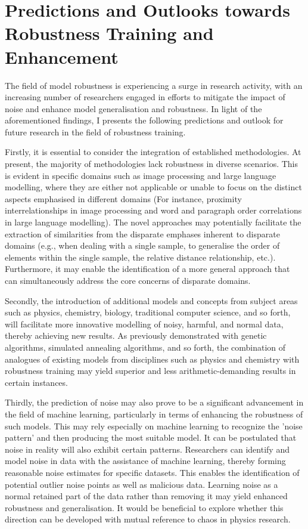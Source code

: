\documentclass{article}
\begin{document}
\section{Predictions and Outlooks towards Robustness Training and Enhancement}

The field of model robustness is experiencing a surge in research activity, with an increasing number of researchers engaged in efforts to mitigate the impact of noise and enhance model generalisation and robustness. In light of the aforementioned findings, I presents the following predictions and outlook for future research in the field of robustness training.

Firstly, it is essential to consider the integration of established methodologies. At present, the majority of methodologies lack robustness in diverse scenarios. This is evident in specific domains such as image processing and large language modelling, where they are either not applicable or unable to focus on the distinct aspects emphasised in different domains (For instance, proximity interrelationships in image processing and word and paragraph order correlations in large language modelling). The novel approaches may potentially facilitate the extraction of similarities from the disparate emphases inherent to disparate domains (e.g., when dealing with a single sample, to generalise the order of elements within the single sample, the relative distance relationship, etc.). Furthermore, it may enable the identification of a more general approach that can simultaneously address the core concerns of disparate domains.

Secondly, the introduction of additional models and concepts from subject areas such as physics, chemistry, biology, traditional computer science, and so forth, will facilitate more innovative modelling of noisy, harmful, and normal data, thereby achieving new results. As previously demonstrated with genetic algorithms, simulated annealing algorithms, and so forth, the combination of analogues of existing models from disciplines such as physics and chemistry with robustness training may yield superior and less arithmetic-demanding results in certain instances.

Thirdly, the prediction of noise may also prove to be a significant advancement in the field of machine learning, particularly in terms of enhancing the robustness of such models. This may rely especially on machine learning to recognize the 'noise pattern' and then producing the most suitable model. It can be postulated that noise in reality will also exhibit certain patterns. Researchers can identify and model noise in data with the assistance of machine learning, thereby forming reasonable noise estimates for specific datasets. This enables the identification of potential outlier noise points as well as malicious data. Learning noise as a normal retained part of the data rather than removing it may yield enhanced robustness and generalisation. It would be beneficial to explore whether this direction can be developed with mutual reference to chaos in physics research.
\end{document}
